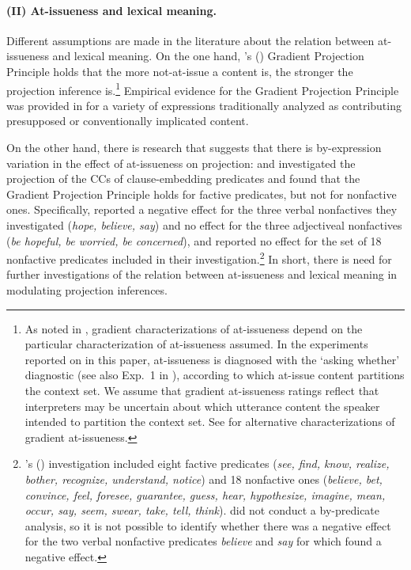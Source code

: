 \documentclass[11pt,fleqn]{article}
\newcommand{\6}{\mbox{$[\hspace*{-.6mm}[$}}
\newcommand{\9}{\mbox{$]\hspace*{-.6mm}]$}}
\newcommand{\citetpos}[1]{\citeauthor{#1}'s (\citeyear{#1})}
\begin{document}
\paragraph{(II) At-issueness and lexical meaning.} Different assumptions are made in the literature about the relation between at-issueness and lexical meaning. On the one hand, \citetpos{tbd-variability} Gradient Projection Principle holds that the more not-at-issue a content is, the stronger the projection inference is.\footnote{As noted in \citet[footnote 7]{tbd-variability}, gradient characterizations of at-issueness depend on the particular characterization of at-issueness assumed. In the experiments reported on in this paper, at-issueness is diagnosed with the `asking whether' diagnostic (see also Exp.~1 in \citealt{tbd-variability}), according to which at-issue content partitions the context set. We assume that gradient at-issueness ratings reflect that interpreters may be uncertain about which utterance content the speaker intended to partition the context set. See \citet[footnote 7]{tbd-variability} for alternative characterizations of gradient at-issueness.} Empirical evidence for the Gradient Projection Principle was provided in \cite{tbd-variability} for a variety of expressions traditionally analyzed as contributing presupposed or conventionally implicated content.

On the other hand, there is research that suggests that there is by-expression variation in the effect of at-issueness on projection: \cite*{djaerv-bacovcin-salt27, djaerv-bacovcin2020} and \citet{mahler-etal2020} investigated the projection of the CCs of clause-embedding predicates and found that the Gradient Projection Principle holds for factive predicates, but not for nonfactive ones. Specifically, \citet{djaerv-bacovcin2020} reported a negative effect for the three verbal nonfactives they investigated ({\em hope, believe, say}) and no effect for the three adjectiveal nonfactives ({\em be hopeful, be worried, be concerned}), and \cite{mahler-etal2020} reported no effect for the set of 18 nonfactive predicates included in their investigation.\footnote{\citetpos{mahler-etal2020} investigation included eight factive predicates (\emph{see, find, know, realize, bother, recognize, understand, notice}) and 18 nonfactive ones (\emph{believe, bet, convince, feel, foresee, guarantee, guess, hear, hypothesize, imagine, mean, occur, say, seem, swear, take, tell, think}). \cite{mahler-etal2020} did not conduct a by-predicate analysis, so it is not possible to identify whether there was a negative effect for the two verbal nonfactive predicates \emph{believe} and \emph{say} for which \cite{djaerv-bacovcin2020} found a negative effect.} In short, there is need for further investigations of the relation between at-issueness and lexical meaning in modulating projection inferences.
\end{document}
